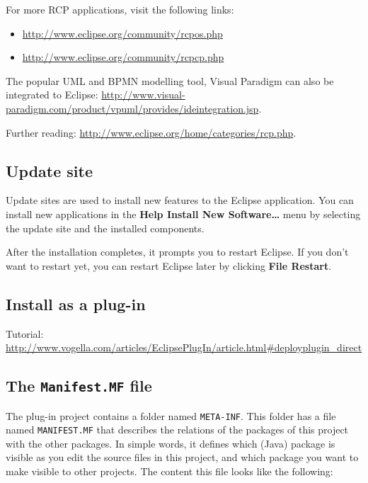 \documentclass[]{report}
\begin{document}
For more RCP applications, visit the following links:

\begin{itemize}
\itemsep1pt\parskip0pt
\item
  \url{http://www.eclipse.org/community/rcpos.php}
\item
  \url{http://www.eclipse.org/community/rcpcp.php}
\end{itemize}

The popular UML and BPMN modelling tool, Visual Paradigm can also be
integrated to Eclipse:
\url{http://www.visual-paradigm.com/product/vpuml/provides/ideintegration.jsp}.

Further reading: \url{http://www.eclipse.org/home/categories/rcp.php}.

\subsection{Update site}

Update sites are used to install new features to the Eclipse
application. You can install new applications in the \textbf{Help
\textbar{} Install New Software\ldots{}} menu by selecting the update
site and the installed components.

After the installation completes, it prompts you to restart Eclipse. If
you don't want to restart yet, you can restart Eclipse later by clicking
\textbf{File \textbar{} Restart}.

\subsection{Install as a plug-in}

Tutorial:
\url{http://www.vogella.com/articles/EclipsePlugIn/article.html\#deployplugin_direct}

\subsection{The \texttt{Manifest.MF} file}

The plug-in project contains a folder named \texttt{META-INF}. This
folder has a file named \texttt{MANIFEST.MF} that describes the
relations of the packages of this project with the other packages. In
simple words, it defines which (Java) package is visible as you edit the
source files in this project, and which package you want to make visible
to other projects. The content this file looks like the following:
\end{document}
